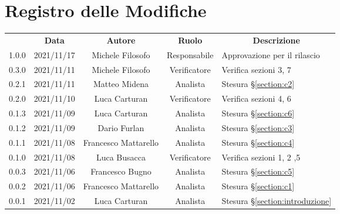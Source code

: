 \thispagestyle{empty}
\section*{Registro delle Modifiche}

\begin{center}
\renewcommand{\arraystretch}{1.8}
\begin{longtable}[c]{c | c | c | c | p{5cm}}
\rowcolor[HTML]{125E28}
\multicolumn{1}{c}{\color[HTML]{FFFFFF} \textbf{Versione}} & 
\multicolumn{1}{c}{\color[HTML]{FFFFFF} \textbf{Data}} & 
\multicolumn{1}{c}{\color[HTML]{FFFFFF} \textbf{Autore}} & 
\multicolumn{1}{c}{\color[HTML]{FFFFFF} \textbf{Ruolo}} & 
\multicolumn{1}{c}{\color[HTML]{FFFFFF} \textbf{Descrizione}} \\

1.0.0 & 2021/11/17 & Michele Filosofo & Responsabile & Approvazione per il rilascio \\ \hline

0.3.0 & 2021/11/11 & Michele Filosofo & Verificatore & Verifica sezioni 3, 7 \\ \hline

0.2.1 & 2021/11/11 & Matteo Midena & Analista & Stesura §\ref{section:c2} \\ \hline
0.2.0 & 2021/11/10 & Luca Carturan & Verificatore & Verifica sezioni 4, 6 \\ \hline

0.1.3 & 2021/11/09 & Luca Carturan & Analista & Stesura §\ref{section:c6} \\ \hline
0.1.2 & 2021/11/09 & Dario Furlan & Analista & Stesura §\ref{section:c3} \\ \hline
0.1.1 & 2021/11/08 & Francesco Mattarello & Analista & Stesura §\ref{section:c4} \\ \hline
0.1.0 & 2021/11/08 & Luca Busacca & Verificatore & Verifica sezioni 1, 2 ,5 \\ \hline

0.0.3 & 2021/11/06 & Francesco Bugno & Analista & Stesura §\ref{section:c5} \\ \hline
0.0.2 & 2021/11/06 & Francesco Mattarello & Analista & Stesura §\ref{section:c1} \\ \hline
0.0.1 & 2021/11/02 & Luca Carturan & Analista & Stesura §\ref{section:introduzione} \\

\end{longtable}

\end{center}